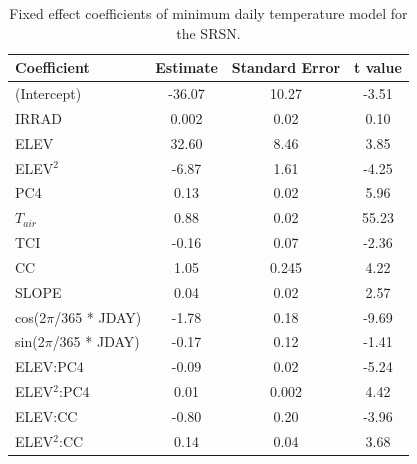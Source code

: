 \documentclass{ametsoc}
\begin{document}
\begin{table}[t]
\caption{Fixed effect coefficients of minimum daily temperature model for the SRSN.}\label{tab:3}
\begin{center}
\begin{tabular}{lccc}
\hline\hline
Coefficient                        & Estimate & Standard Error & t value \\
\hline
(Intercept)                        & -36.07 & 10.27       & -3.51 \\
IRRAD                              & 0.002  & 0.02        & 0.10  \\
ELEV                               & 32.60  & 8.46        & 3.85  \\
ELEV$^2$                           & -6.87  & 1.61        & -4.25 \\
PC4                                & 0.13   & 0.02        & 5.96  \\
$T_{air}$                          & 0.88   & 0.02        & 55.23 \\
TCI                                & -0.16  & 0.07        & -2.36 \\
CC                                 & 1.05   & 0.245       & 4.22  \\
SLOPE                              & 0.04   & 0.02        & 2.57  \\
cos(2$\pi$/365 * JDAY)             & -1.78  & 0.18        & -9.69 \\
sin(2$\pi$/365 * JDAY)             & -0.17  & 0.12        & -1.41 \\
ELEV:PC4                           & -0.09  & 0.02        & -5.24 \\
ELEV$^2$:PC4                       & 0.01   & 0.002       & 4.42  \\
ELEV:CC                            & -0.80  & 0.20        & -3.96 \\
ELEV$^2$:CC                        & 0.14   & 0.04        & 3.68  \\
\hline
\end{tabular}
\end{center}
\end{table}
\end{document}
